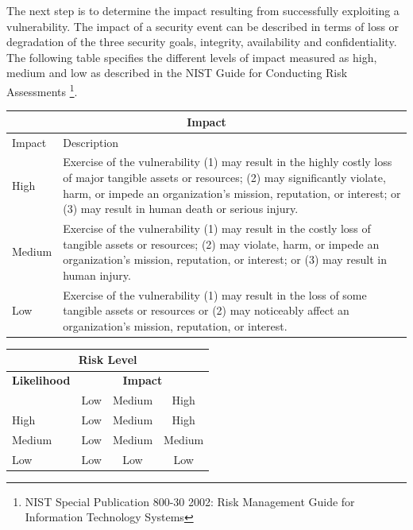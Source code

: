 \documentclass[a4paper, toc=index, 12pt, DIV14, twoside, BCOR2cm, headsepline, numbers=noenddot, bibliography=totoc]{scrbook}
\begin{document}
\vspace{5mm}

The next step is to determine the impact resulting from successfully exploiting a vulnerability. The impact of a security event can be described in terms of loss or degradation of the three security goals, integrity, availability and confidentiality. The following table specifies the different levels of impact measured as high, medium and low as described in the NIST Guide for Conducting Risk Assessments \footnote{NIST Special Publication 800-30 2002: Risk Management Guide for Information Technology Systems}.
\begin{center}
\begin{tabular}{|l|p{10cm}|}
\hline
\multicolumn{2}{|c|}{\bf Impact} \\
\hline
Impact & Description \\
\hline
\hline
High   & \hspace*{20pt}
Exercise of the vulnerability (1) may result in the highly costly loss of major tangible assets or resources; (2) may significantly violate, harm, or impede an organization's mission, reputation, or interest; or (3) may result in human death or serious injury. \\
\hline
Medium & \hspace*{20pt}
Exercise of the vulnerability (1) may result in the costly loss of tangible assets or resources; (2) may violate, harm, or impede an organization's mission, reputation, or interest; or (3) may result in human injury. \\
\hline
Low   & \hspace*{20pt}
Exercise of the vulnerability (1) may result in the loss of some tangible assets or resources or (2) may noticeably affect an organization's mission, reputation, or interest. \\
\hline
\end{tabular}
\end{center}
%
\vspace{5mm}
%

\begin{center}
\begin{tabular}{|l|c|c|c|}
\hline
\multicolumn{4}{|c|}{{\bf Risk Level}} \\
\hline
{{\bf Likelihood}} & \multicolumn{3}{c|}{{\bf Impact}} \\ %
     & Low & Medium & High \\  \hline
 High & Low & Medium & High  \\
\hline
 Medium & Low & Medium & Medium \\
\hline
 Low & Low & Low & Low \\
\hline
\end{tabular}
\end{center}
\end{document}
